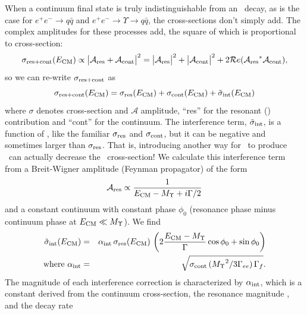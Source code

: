 \documentclass{cornell}
\begin{document}
When a continuum final state is truly indistinguishable from an \ups\
decay, as is the case for $e^+e^- \to q\bar{q}$ and $e^+e^- \to
\Upsilon \to q\bar{q}$, the cross-sections don't simply add.  The
complex amplitudes for these processes add, the square of which is
proportional to cross-section: \label{sec:earlyinterference}
%
\newcommand{\res}{{\mbox{\scriptsize res}}}
\newcommand{\cont}{{\mbox{\scriptsize cont}}}
\newcommand{\inter}{{\mbox{\scriptsize int}}}
\newcommand{\aye}{{\mathcal A}}
\begin{equation}
  \sigma_{\res+\cont}(E_\subs{CM}) \propto \big| \aye_\res + \aye_\cont \big|^2 =
  \big| \aye_\res \big|^2 + \big| \aye_\cont \big|^2 + 2 {\mathcal
  Re}({\aye_\res}^* \aye_\cont) \mbox{,}
\end{equation}
so we can re-write $\sigma_{\res+\cont}$ as 
\begin{equation}
  \sigma_{\res+\cont}(E_\subs{CM}) =
  \sigma_\res(E_\subs{CM}) + \sigma_\cont(E_\subs{CM}) + \tilde{\sigma}_\inter(E_\subs{CM})
  \label{eqn:rescontinter}
\end{equation}
where $\sigma$ denotes cross-section and $\aye$ amplitude, ``res'' for
the resonant (\ups) contribution and ``cont'' for the continuum.  The
interference term, $\tilde{\sigma}_\inter$, is a function of \ecm, like the
familiar $\sigma_\res$ and $\sigma_\cont$, but it can be negative and
sometimes larger than $\sigma_\res$.  That is, introducing another way
for \ee\ to produce \qqbar\ can actually decrease the \qqbar\
cross-section!  We calculate this interference term from a
Breit-Wigner amplitude (Feynman propagator) of the form
\begin{equation}
  \aye_\res \propto \frac{1}{E_\subs{CM} - M_\Upsilon + i\Gamma/2}
  \label{eqn:bwasprop}
\end{equation}
and a constant continuum with constant phase $\phi_0$ (resonance phase
minus continuum phase at $E_{\mbox{\scriptsize CM}} \ll M_\Upsilon$).  We find
\begin{eqnarray}
  \tilde{\sigma}_\inter(E_\subs{CM}) &=& \alpha_\subs{int} \, \sigma_\subs{res}(E_\subs{CM}) \,
  \left(2 \frac{E_\subs{CM} - M_\Upsilon}{\Gamma} \cos \phi_0 + \sin
  \phi_0 \right) \\
  \mbox{where } \alpha_\subs{int} &=& \sqrt{\sigma_\cont \, ({M_\Upsilon}^2 / 3 \Gamma_{ee}) \, \Gamma_f} \mbox{.}
  \label{eqn:yint}
\end{eqnarray}
The magnitude of each interference correction is characterized by
$\alpha_{\mbox{\scriptsize int}}$, which is a constant derived from the continuum
cross-section, the resonance magnitude \gee, and the decay rate
\end{document}
